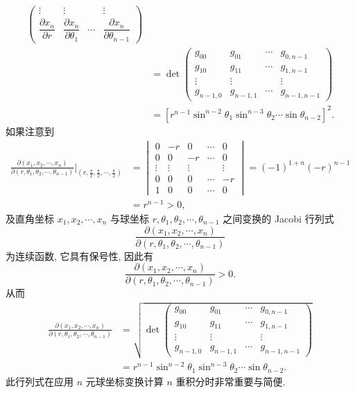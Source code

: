 \begin{example}
\begin{align*}
\begin{pmatrix}
    \vdots & \vdots & & \vdots \\
    \dfrac{\partial x_{n}}{\partial r} & \dfrac{\partial x_{n}}{\partial\theta_{1}} & \cdots & \dfrac{\partial x_{n}}{\partial\theta_{n-1}}
  \end{pmatrix} \\
  &= \det\begin{pmatrix}
    g_{00} & g_{01} & \cdots & g_{0,n-1} \\
    g_{10} & g_{11} & \cdots & g_{1,n-1} \\
    \vdots & \vdots & & \vdots \\
    g_{n-1,0} & g_{n-1,1} & \cdots & g_{n-1,n-1}
  \end{pmatrix} \\
  &= \left[r^{n-1}\sin^{n-2}\theta_{1}\sin^{n-3}\theta_{2}\cdots\sin\theta_{n-2}\right]^{2}.
\end{align*}
如果注意到
\begin{align*}
  \frac{\partial(x_{1}, x_{2}, \cdots, x_{n})}{\partial(r, \theta_{1}, \theta_{2}, \cdots, \theta_{n-1})}\bigg|_{\left(r, \frac{\pi}{2}, \frac{\pi}{2}, \cdots, \frac{\pi}{2}\right)}
  &= \begin{vmatrix}
    0 & -r & 0 & \cdots & 0 \\
    0 & 0 & -r & \cdots & 0 \\
    \vdots & \vdots & \vdots & & \vdots \\
    0 & 0 & 0 & \cdots & -r \\
    1 & 0 & 0 & \cdots & 0
  \end{vmatrix} = (-1)^{1+n}(-r)^{n-1} \\
  &= r^{n-1} > 0,
\end{align*}
及直角坐标 $x_{1}, x_{2}, \cdots, x_{n}$ 与球坐标 $r, \theta_{1}, \theta_{2}, \cdots, \theta_{n-1}$ 之间变换的 Jacobi 行列式
\[
  \frac{\partial(x_{1}, x_{2}, \cdots, x_{n})}{\partial(r, \theta_{1}, \theta_{2}, \cdots, \theta_{n-1})}
\]
为连续函数, 它具有保号性, 因此有
\[
  \frac{\partial(x_{1}, x_{2}, \cdots, x_{n})}{\partial(r, \theta_{1}, \theta_{2}, \cdots, \theta_{n-1})} > 0.
\]
从而
\begin{align*}
  \frac{\partial(x_{1}, x_{2}, \cdots, x_{n})}{\partial(r, \theta_{1}, \theta_{2}, \cdots, \theta_{n-1})}
  &= \sqrt{\det\begin{pmatrix}
    g_{00} & g_{01} & \cdots & g_{0,n-1} \\
    g_{10} & g_{11} & \cdots & g_{1,n-1} \\
    \vdots & \vdots & & \vdots \\
    g_{n-1,0} & g_{n-1,1} & \cdots & g_{n-1,n-1}
  \end{pmatrix}} \\
  &= r^{n-1}\sin^{n-2}\theta_{1}\sin^{n-3}\theta_{2}\cdots\sin\theta_{n-2}.
\end{align*}
此行列式在应用 $n$ 元球坐标变换计算 $n$ 重积分时非常重要与简便.
\end{example}


